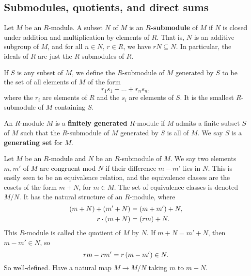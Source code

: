 \subsection{Submodules, quotients, and direct sums}

\begin{definition}
Let $ M $ be an $ R $-module. A subset $ N $ of $ M $ is an \textbf{$ R $-submodule} of $ M $ if $ N $ is closed under addition and multiplication by elements of $ R $. That is, $ N $ is an additive subgroup of $ M $, and for all $ n \in N $, $ r \in R $, we have $ rN \subseteq N $. In particular, the ideals of $ R $ are just the $ R $-submodules of $ R $.
\end{definition}

\begin{definition}
If $ S $ is any subset of $ M $, we define the $ R $-submodule of $ M $ generated by $ S $ to be the set of all elements of $ M $ of the form
$$ r_1s_1 + \dots + r_ns_n, $$
where the $ r_i $ are elements of $ R $ and the $ s_i $ are elements of $ S $. It is the smallest $ R $-submodule of $ M $ containing $ S $.
\end{definition}

\begin{definition}
An $ R $-module $ M $ is a \textbf{finitely generated} $ R $-module if $ M $ admits a finite subset $ S $ of $ M $ such that the $ R $-submodule of $ M $ generated by $ S $ is all of $ M $. We say $ S $ is a \textbf{generating set} for $ M $.
\end{definition}

\begin{definition}
Let $ M $ be an $ R $-module and $ N $ be an $ R $-submodule of $ M $. We say two elements $ m, m' $ of $ M $ are congruent mod $ N $ if their difference $ m - m' $ lies in $ N $. This is easily seen to be an equivalence relation, and the equivalence classes are the cosets of the form $ m + N $, for $ m \in M $. The set of equivalence classes is denoted $ M / N $. It has the natural structure of an $ R $-module, where
\begin{align*}
\left( m + N \right) + \left( m' + N \right) & = \left( m + m' \right) + N, \\
r \cdot \left( m + N \right) & = \left( rm \right) + N.
\end{align*}
This $ R $-module is called the quotient of $ M $ by $ N $. If $ m + N = m' + N $, then $ m - m' \in N $, so
$$ rm - rm' = r\left( m - m' \right) \in N. $$
So well-defined. Have a natural map $ M \to M / N $ taking $ m $ to $ m + N $.
\end{definition}

